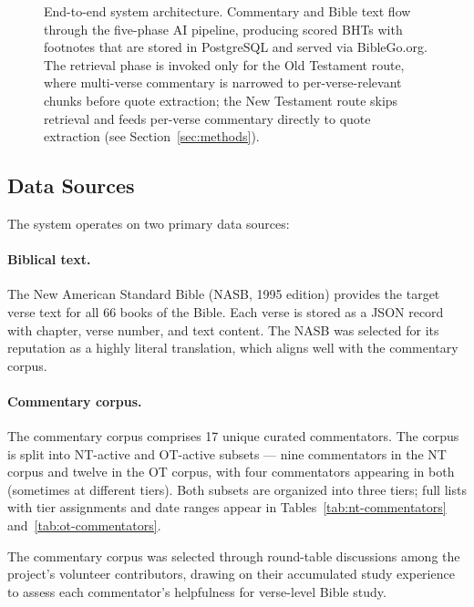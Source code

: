 \begin{figure}[t]
\caption{End-to-end system architecture. Commentary and Bible text flow through the five-phase AI pipeline, producing scored BHTs with footnotes that are stored in PostgreSQL and served via BibleGo.org. The retrieval phase is invoked only for the Old Testament route, where multi-verse commentary is narrowed to per-verse-relevant chunks before quote extraction; the New Testament route skips retrieval and feeds per-verse commentary directly to quote extraction (see Section~\ref{sec:methods}).}
\label{fig:architecture}
\end{figure}

\subsection{Data Sources}

The system operates on two primary data sources:

\paragraph{Biblical text.} The New American Standard Bible (NASB, 1995 edition) provides the target verse text for all 66 books of the Bible. Each verse is stored as a JSON record with chapter, verse number, and text content. The NASB was selected for its reputation as a highly literal translation, which aligns well with the commentary corpus.

\paragraph{Commentary corpus.} The commentary corpus comprises 17 unique curated commentators. The corpus is split into NT-active and OT-active subsets --- nine commentators in the NT corpus and twelve in the OT corpus, with four commentators appearing in both (sometimes at different tiers). Both subsets are organized into three tiers; full lists with tier assignments and date ranges appear in Tables~\ref{tab:nt-commentators} and~\ref{tab:ot-commentators}.

The commentary corpus was selected through round-table discussions among the project's volunteer contributors, drawing on their accumulated study experience to assess each commentator's helpfulness for verse-level Bible study.

